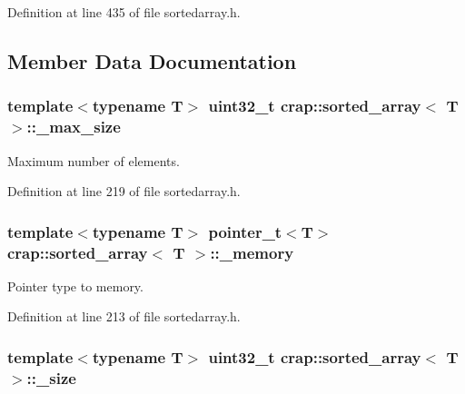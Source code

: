 Definition at line 435 of file sortedarray.\+h.



\subsection{Member Data Documentation}
\hypertarget{classcrap_1_1sorted__array_aea8cbb8c465d41aebecdf939113fa993}{
\subsubsection[{\+\_\+max\+\_\+size}]{\setlength{\rightskip}{0pt plus 5cm}template$<$typename T$>$ uint32\+\_\+t {\bf crap\+::sorted\+\_\+array}$<$ T $>$\+::\+\_\+max\+\_\+size\hspace{0.3cm}{\ttfamily [protected]}}}\label{classcrap_1_1sorted__array_aea8cbb8c465d41aebecdf939113fa993}


Maximum number of elements. 



Definition at line 219 of file sortedarray.\+h.

\hypertarget{classcrap_1_1sorted__array_afa20ac100c5b603d0a522c94e7cd549f}{
\subsubsection[{\+\_\+memory}]{\setlength{\rightskip}{0pt plus 5cm}template$<$typename T$>$ {\bf pointer\+\_\+t}$<$T$>$ {\bf crap\+::sorted\+\_\+array}$<$ T $>$\+::\+\_\+memory\hspace{0.3cm}{\ttfamily [protected]}}}\label{classcrap_1_1sorted__array_afa20ac100c5b603d0a522c94e7cd549f}


Pointer type to memory. 



Definition at line 213 of file sortedarray.\+h.

\hypertarget{classcrap_1_1sorted__array_ad33ca1ee9c30abf81658b3c2773ae9d1}{
\subsubsection[{\+\_\+size}]{\setlength{\rightskip}{0pt plus 5cm}template$<$typename T$>$ uint32\+\_\+t {\bf crap\+::sorted\+\_\+array}$<$ T $>$\+::\+\_\+size\hspace{0.3cm}{\ttfamily [protected]}}}\label{classcrap_1_1sorted__array_ad33ca1ee9c30abf81658b3c2773ae9d1}


